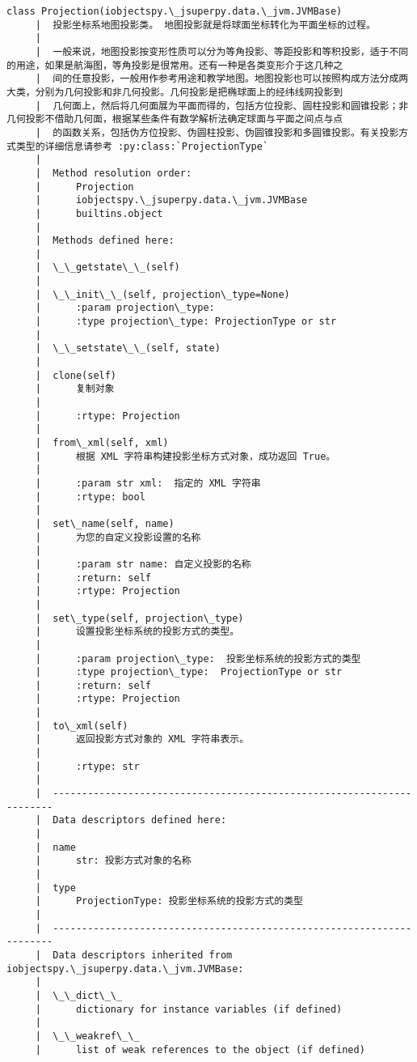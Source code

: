 \documentclass[11pt]{article}
\begin{document}
\begin{Verbatim}[commandchars=\\\{\}]
    class Projection(iobjectspy.\_jsuperpy.data.\_jvm.JVMBase)
     |  投影坐标系地图投影类。 地图投影就是将球面坐标转化为平面坐标的过程。
     |  
     |  一般来说，地图投影按变形性质可以分为等角投影、等距投影和等积投影，适于不同的用途，如果是航海图，等角投影是很常用。还有一种是各类变形介于这几种之
     |  间的任意投影，一般用作参考用途和教学地图。地图投影也可以按照构成方法分成两大类，分别为几何投影和非几何投影。几何投影是把椭球面上的经纬线网投影到
     |  几何面上，然后将几何面展为平面而得的，包括方位投影、圆柱投影和圆锥投影；非几何投影不借助几何面，根据某些条件有数学解析法确定球面与平面之间点与点
     |  的函数关系，包括伪方位投影、伪圆柱投影、伪圆锥投影和多圆锥投影。有关投影方式类型的详细信息请参考 :py:class:`ProjectionType`
     |  
     |  Method resolution order:
     |      Projection
     |      iobjectspy.\_jsuperpy.data.\_jvm.JVMBase
     |      builtins.object
     |  
     |  Methods defined here:
     |  
     |  \_\_getstate\_\_(self)
     |  
     |  \_\_init\_\_(self, projection\_type=None)
     |      :param projection\_type:
     |      :type projection\_type: ProjectionType or str
     |  
     |  \_\_setstate\_\_(self, state)
     |  
     |  clone(self)
     |      复制对象
     |      
     |      :rtype: Projection
     |  
     |  from\_xml(self, xml)
     |      根据 XML 字符串构建投影坐标方式对象，成功返回 True。
     |      
     |      :param str xml:  指定的 XML 字符串
     |      :rtype: bool
     |  
     |  set\_name(self, name)
     |      为您的自定义投影设置的名称
     |      
     |      :param str name: 自定义投影的名称
     |      :return: self
     |      :rtype: Projection
     |  
     |  set\_type(self, projection\_type)
     |      设置投影坐标系统的投影方式的类型。
     |      
     |      :param projection\_type:  投影坐标系统的投影方式的类型
     |      :type projection\_type:  ProjectionType or str
     |      :return: self
     |      :rtype: Projection
     |  
     |  to\_xml(self)
     |      返回投影方式对象的 XML 字符串表示。
     |      
     |      :rtype: str
     |  
     |  ----------------------------------------------------------------------
     |  Data descriptors defined here:
     |  
     |  name
     |      str: 投影方式对象的名称
     |  
     |  type
     |      ProjectionType: 投影坐标系统的投影方式的类型
     |  
     |  ----------------------------------------------------------------------
     |  Data descriptors inherited from iobjectspy.\_jsuperpy.data.\_jvm.JVMBase:
     |  
     |  \_\_dict\_\_
     |      dictionary for instance variables (if defined)
     |  
     |  \_\_weakref\_\_
     |      list of weak references to the object (if defined)
    

\end{Verbatim}
\end{document}

